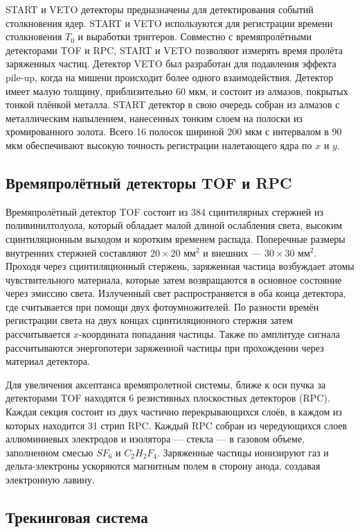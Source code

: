 START и VETO детекторы предназначены для детектирования событий столкновения ядер.
START и VETO используются для регистрации времени столкновения $T_0$ и выработки триггеров.
Совместно с времяпролётными детекторами TOF и RPC, START и VETO позволяют измерять время пролёта заряженных частиц.
Детектор VETO был разработан для подавления эффекта pile-up, когда на мишени происходит более одного взаимодействия.
Детектор имеет малую толщину, приблизительно 60 мкм, и состоит из алмазов, покрытых тонкой плёнкой металла. 
START детектор в свою очередь собран из алмазов с металлическим напылением, нанесенных тонким слоем на полоски из хромированного золота.
Всего 16 полосок шириной 200 мкм с интервалом в 90 мкм обеспечивают высокую точность регистрации налетающего ядра по $x$ и $y$.

\subsection{Времяпролётный детекторы TOF и RPC}

Времяпролётный детектор TOF состоит из 384 сцинтилярных стержней из поливинилтолуола, который обладает малой длиной ослабления света, высоким сцинтиляционным выходом и коротким временем распада.
Поперечные размеры внутренних стержней составляют $20 \times 20$ мм$^2$ и внешних --- $30\times30$ мм$^2$.
Проходя через сцинтиляционный стержень, заряженная частица возбуждает атомы чувствительного материала, которые затем возвращаются в основное состояние через эмиссию света.
Излученный свет распространяется в оба конца детектора, где считывается при помощи двух фотоумножителей.
По разности времён регистрации света на двух концах сцинтиляционного стержня затем рассчитывается $x$-координата попадания частицы.
Также по амплитуде сигнала рассчитываются энергопотери заряженной частицы при прохождении через материал детектора.

Для увеличения аксептанса времяпролетной системы, ближе к оси пучка за детекторами TOF находятся 6 резистивных плоскостных детекторов (RPC). 
Каждая секция состоит из двух частично перекрывающихся слоёв, в каждом из которых находится 31 стрип RPC.
Каждый RPC собран из чередующихся слоев аллюминиевых электродов и изолятора --- стекла --- в газовом объеме, заполненном смесью $SF_6$ и $C_2H_2F_4$.
Заряженные частицы ионизируют газ и дельта-электроны ускоряются магнитным полем в сторону анода, создавая электронную лавину.

\subsection{ Трекинговая система }

